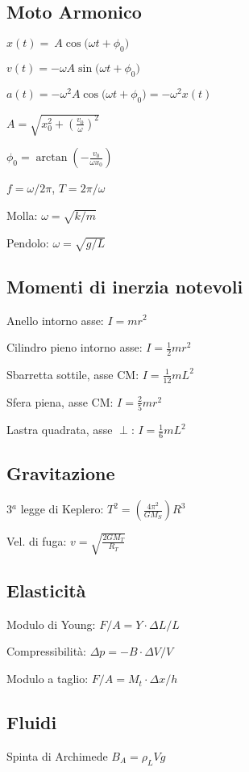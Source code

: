 \documentclass[10pt]{article}
\begin{document}
\begin{multicols}{3}
\subsection*{Moto Armonico}

$ x(t) = \: A \cos\bigl( \omega t + \phi_0 \bigr) $

$ v(t) = -\omega A \sin\bigl( \omega t + \phi_0 \bigr) $

$ a(t) = -\omega^2A \cos \bigl( \omega t + \phi_0 \bigr) = -\omega^2 x(t)$

$\displaystyle A  = \sqrt{x_0^2 + \left( \frac {v_0} \omega \right)^2 }$

$\displaystyle \phi_0 = \arctan \left( - \frac {v_0} {\omega x_0} \right)$

$f =  \omega / {2\pi}$, $T = {2\pi} / \omega$

Molla: $\omega = \sqrt{k / m}$

Pendolo: $\omega = \sqrt{g / L }$

\subsection*{Momenti di inerzia notevoli}

Anello intorno asse: $I= m r^2$

Cilindro pieno intorno asse: $I= \frac 1 2 m r^2$

Sbarretta sottile, asse CM: $I= \frac 1 {12} m L^2$

Sfera piena, asse CM: $I = \frac 2 {5} m r^2$

Lastra quadrata, asse $\perp$: $I = \frac 1 {6} m L^2$

\subsection*{Gravitazione}
3$^a$ legge di Keplero: $T^2=\left(\frac{4\pi^2}{G M_S}\right)R^3$

Vel. di fuga: $v=\sqrt{\frac{2G M_T}{R_T}} $

\subsection*{Elasticit\`a}
Modulo di Young: $F/A = Y \cdot \Delta L/L$

Compressibilit\`a: $\Delta p = - B \cdot \Delta V/V$

Modulo a taglio: $F/A = M_t \cdot \Delta x/h$

\subsection*{Fluidi}
Spinta di Archimede $B_A=\rho_L V g$


\end{multicols}
\end{document}
